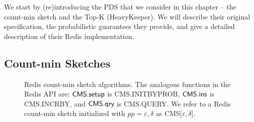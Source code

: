 We start by (re)introducing the PDS that we consider in this chapter -- the count-min sketch and the Top-K (HeavyKeeper). We will describe their original specification, the probabilistic guarantees they provide, and give a detailed description of their Redis implementation.

\subsection{Count-min Sketches}
\label{sec:cms-intro}

\begin{figure*}[htp]
    \centering
\begin{pcvstack}[boxed,space=1em]
\begin{pchstack}
    \begin{pcvstack}[space=0.5em]
       \end{pcvstack}
    \begin{pcvstack}[space=0.5em]
    \end{pcvstack}	
\end{pchstack}		
\end{pcvstack}
\caption[The Redis CMS Structure.]{Redis count-min sketch algorithms. 
The analogous functions in the Redis API are: $\textsf{CMS}.\textsf{setup}$ is \textsf{CMS.INITBYPROB}, $\textsf{CMS}.\textsf{ins}$ is \textsf{CMS.INCRBY}, and $\textsf{CMS}.\textsf{qry}$ is \textsf{CMS.QUERY}.
We refer to a Redis count-min sketch initialized with $pp=\varepsilon, \delta$ as CMS[$\varepsilon, \delta$].} 
\label{fig:redis-cms}
\end{figure*}

